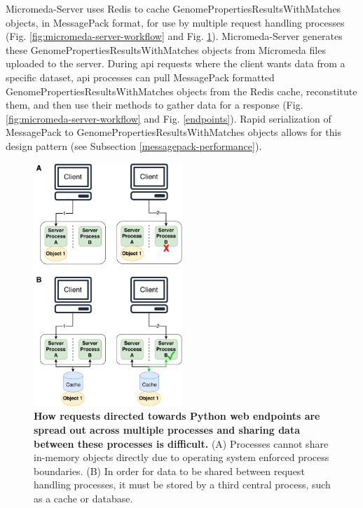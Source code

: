 Micromeda-Server uses Redis to cache GenomePropertiesResultsWithMatches objects, 
in MessagePack format, for use by multiple request handling processes (Fig. 
\ref{fig:micromeda-server-workflow} and Fig. \ref{fig:client-processing}). 
Micromeda-Server generates these GenomePropertiesResultsWithMatches objects from 
Micromeda files uploaded to the server. During \gls{api} requests where the 
client wants data from a specific dataset, \gls{api} processes can pull 
MessagePack formatted GenomePropertiesResultsWithMatches objects from the Redis 
cache, reconstitute them, and then use their methods to gather data for a 
response (Fig. \ref{fig:micromeda-server-workflow} and Fig. \ref{endpoints}). 
Rapid serialization of MessagePack to GenomePropertiesResultsWithMatches objects 
allows for this design pattern (see Subsection \ref{messagepack-performance}).

\begin{figure}[!ht]
  \centering
	\includegraphics[width=0.50\textwidth]{media/Client-Processing.pdf}
	 \caption[How requests directed towards Python web endpoints are spread out across 
multiple processes and sharing data between these processes is 
difficult.]{\textbf{How requests directed towards Python web endpoints are spread 
out across multiple processes and sharing data between these processes is 
difficult.} (A) Processes cannot share in-memory objects directly due to 
operating system enforced process boundaries. (B) In order for data to be shared 
between request handling processes, it must be stored by a third central 
process, such as a cache or database.}
	 \label{fig:client-processing}
\end{figure}

